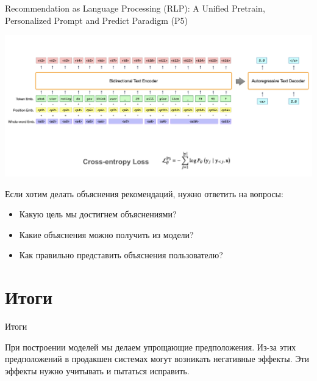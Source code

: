 \documentclass[11pt,aspectratio=169,handout]{beamer}
\begin{document}
\begin{frame}{Recommendation as Language Processing (RLP): A Unified Pretrain, Personalized Prompt and Predict Paradigm (P5) \cite{P5}}

\begin{center}
\includegraphics[scale=0.25]{images/p5-arch.png}
\end{center}

\end{frame}

\begin{frame}

\begin{tcolorbox}[colback=info!5,colframe=info!80,title=]
Если хотим делать объяснения рекомендаций, нужно ответить на вопросы:
\begin{itemize}
\item Какую цель мы достигнем объяснениями?
\item Какие объяснения можно получить из модели?
\item Как правильно представить объяснения пользователю?
\end{itemize}
\end{tcolorbox}

\end{frame}


\section{Итоги}

\begin{frame}{Итоги}

\begin{tcolorbox}[colback=info!5,colframe=info!80,title=]
При построении моделей мы делаем упрощающие предположения. Из-за этих предположений в продакшен системах могут возникать негативные эффекты. Эти эффекты нужно учитывать и пытаться исправить.
\end{tcolorbox}

\end{frame}
\end{document}
